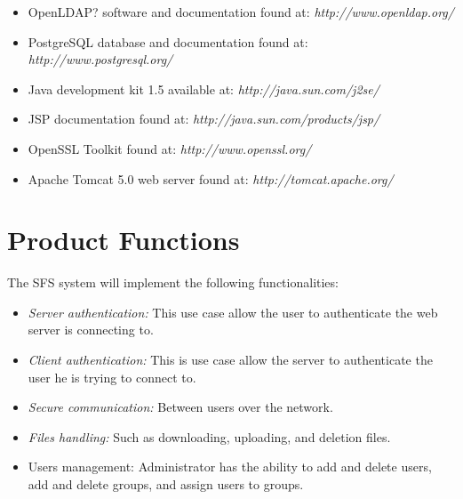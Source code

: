 \begin{itemize}

\item OpenLDAP? software and documentation found at: \emph{http://www.openldap.org/}

\item PostgreSQL database and documentation found at: \emph{http://www.postgresql.org/}

\item  Java development kit 1.5 available at: \emph{http://java.sun.com/j2se/}

\item JSP documentation found at: \emph{http://java.sun.com/products/jsp/}

\item OpenSSL  Toolkit found at: \emph{http://www.openssl.org/}

\item Apache Tomcat 5.0 web server found at: \emph{http://tomcat.apache.org/}

\end{itemize}

\section{Product Functions}

The SFS system will implement the following functionalities:

\begin{itemize}

\item \emph{Server authentication:} This use case allow
the user to authenticate the web server is connecting to.

\item \emph{Client authentication:} This is use case allow the server
to authenticate the user he is trying to connect to.

\item \emph{Secure communication:} Between users over the network.

\item \emph{Files handling:} Such as downloading, uploading, and
deletion files.

\item Users management: Administrator has the ability to add and delete users, add and delete groups, and assign users to groups.

\end{itemize}



